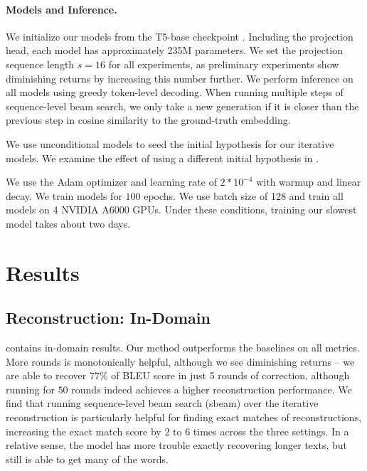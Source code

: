 \documentclass[11pt]{article}
\begin{document}
\paragraph{Models and Inference.} We initialize our models from the T5-base checkpoint \cite{raffel2020t5}. Including the projection head, each model has approximately 235M parameters. We set the projection sequence length $s = 16$ for all experiments, as preliminary experiments show diminishing returns by increasing this number further. We perform inference on all models using greedy token-level decoding. When running multiple steps of sequence-level beam search, we only take a new generation if it is closer than the previous step in cosine similarity to the ground-truth embedding.

We use unconditional models to seed the initial hypothesis for our iterative models. We examine the effect of using a different initial hypothesis in .

We use the Adam optimizer and learning rate of $2*10^{-4}$ with warmup and linear decay. We train models for $100$ epochs. We use batch size of 128 and train all models on 4 NVIDIA A6000 GPUs. Under these conditions, training our slowest model takes about two days.

\section{Results}
\label{sec:results}

\subsection{Reconstruction: In-Domain}
 contains in-domain results. Our method outperforms the baselines on all metrics. More rounds is monotonically helpful, although we see diminishing returns – we are able to recover $77\%$ of BLEU score in just 5 rounds of correction, although running for $50$ rounds indeed achieves a higher reconstruction performance. We find that running sequence-level beam search (sbeam) over the iterative reconstruction is particularly helpful for finding exact matches of reconstructions, increasing the exact match score by $2$ to $6$ times across the three settings. In a relative sense, the model has more trouble exactly recovering longer texts, but still is able to get many of the words.

\end{document}
